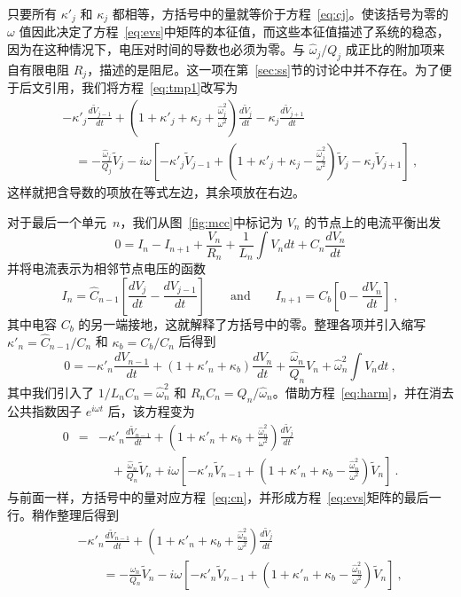 \documentclass[12pt]{article}
\newcommand\tV{\tilde V}
\newcommand\ho{\hat\omega}
\newcommand\hC{\hat C}
\begin{document}
只要所有 $\kappa'_j$ 和 $\kappa_j$ 都相等，方括号中的量就等价于方程~\ref{eq:cj}。使该括号为零的 $\omega$ 值因此决定了方程~\ref{eq:evs}中矩阵的本征值，而这些本征值描述了系统的稳态，因为在这种情况下，电压对时间的导数也必须为零。与 $\ho_j/Q_j$ 成正比的附加项来自有限电阻 $R_j$，描述的是阻尼。这一项在第~\ref{sec:ss}节的讨论中并不存在。为了便于后文引用，我们将方程~\ref{eq:tmp1}改写为
\begin{eqnarray}\label{eq:cjt}
  &&-\kappa'_j \frac{d\tV_{j-1}}{dt}
     +\left(1+\kappa'_j+\kappa_j+\frac{\ho_j^2}{\omega^2}\right)\frac{d\tV_j}{dt}
  -\kappa_j \frac{d\tV_{j+1}}{dt}\\
   &&\quad = -\frac{\ho_j}{Q_j}\tV_j-i\omega\left[-\kappa'_j\tV_{j-1}
      +\left(1+\kappa'_j+\kappa_j-\frac{\ho_j^2}{\omega^2}\right)\tV_j-\kappa_j\tV_{j+1} \right]\ ,\nonumber
\end{eqnarray}
这样就把含导数的项放在等式左边，其余项放在右边。
\par
对于最后一个单元~$n$，我们从图~\ref{fig:mcc}中标记为 $V_n$ 的节点上的电流平衡出发
\begin{equation}
  0=I_n-I_{n+1}+\frac{V_n}{R_n} +\frac{1}{L_n}\int V_ndt + C_n\frac{dV_n}{dt}
\end{equation}
并将电流表示为相邻节点电压的函数
\begin{equation}
  I_n=\hC_{n-1}\left[\frac{dV_j}{dt}-\frac{dV_{j-1}}{dt}\right]
  \qquad\mathrm{and}\qquad
  I_{n+1}=C_b\left[0-\frac{dV_{n}}{dt}\right] \ , 
\end{equation}
其中电容 $C_b$ 的另一端接地，这就解释了方括号中的零。整理各项并引入缩写 $\kappa'_n=\hC_{n-1}/C_n$ 和 $\kappa_b=C_b/C_n$ 后得到
\begin{equation}
  0=-\kappa'_n \frac{dV_{n-1}}{dt}+\left(1+\kappa'_n+\kappa_b\right)  \frac{dV_{n}}{dt} 
  + \frac{\ho_n}{Q_n}V_n +\ho_n^2\int V_n dt\ , 
\end{equation}
其中我们引入了 $1/L_nC_n=\ho_n^2$ 和 $R_nC_n=Q_n/\ho_n$。借助方程~\ref{eq:harm}，并在消去公共指数因子 $e^{i\omega t}$ 后，该方程变为
\begin{eqnarray}
  0&=&-\kappa'_n \frac{d\tV_{n-1}}{dt}
  +\left(1+\kappa'_n+\kappa_b+\frac{\ho_n^2}{\omega^2}\right)\frac{d\tV_j}{dt} \\
   &&\quad + \frac{\ho_n}{Q_n}\tV_n+i\omega\left[-\kappa'_n\tV_{n-1}
      +\left(1+\kappa'_n+\kappa_b-\frac{\ho_n^2}{\omega^2}\right)\tV_n\right]\ .\nonumber
\end{eqnarray}
与前面一样，方括号中的量对应方程~\ref{eq:cn}，并形成方程~\ref{eq:evs}矩阵的最后一行。稍作整理后得到
\begin{eqnarray}\label{eq:cnt}
  &&-\kappa'_n \frac{d\tV_{n-1}}{dt}
  +\left(1+\kappa'_n+\kappa_b+\frac{\ho_n^2}{\omega^2}\right)\frac{d\tV_j}{dt} \\
   &&\qquad = -\frac{\ho_n}{Q_n}\tV_n -i\omega\left[-\kappa'_n\tV_{n-1}
      +\left(1+\kappa'_n+\kappa_b-\frac{\ho_n^2}{\omega^2}\right)\tV_n\right]\ ,\nonumber
\end{eqnarray}
\end{document}
